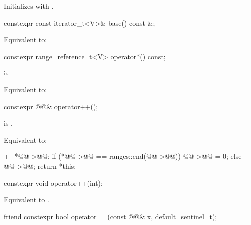 \begin{itemdescr}
\pnum
\effects
Initializes  with .
\end{itemdescr}

\begin{itemdecl}
constexpr const iterator_t<V>& base() const &;
\end{itemdecl}

\begin{itemdescr}
\pnum
\effects
Equivalent to: 
\end{itemdescr}

\begin{itemdecl}
constexpr range_reference_t<V> operator*() const;
\end{itemdecl}

\begin{itemdescr}
\pnum
\expects
{} is .

\pnum
\effects
Equivalent to: 
\end{itemdescr}

\begin{itemdecl}
constexpr @@& operator++();
\end{itemdecl}

\begin{itemdescr}
\pnum
\expects
{} is .

\pnum
\effects
Equivalent to:
\begin{codeblock}
++*@@->@@;
if (*@@->@@ == ranges::end(@@->@@))
  @@->@@ = 0;
else
  --@@->@@;
return *this;
\end{codeblock}
\end{itemdescr}

\begin{itemdecl}
constexpr void operator++(int);
\end{itemdecl}

\begin{itemdescr}
\pnum
\effects
Equivalent to .
\end{itemdescr}

\begin{itemdecl}
friend constexpr bool operator==(const @@& x, default_sentinel_t);
\end{itemdecl}

